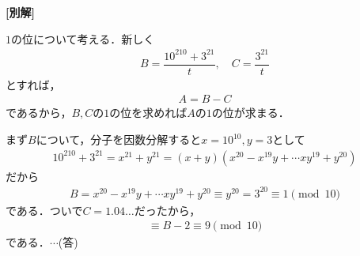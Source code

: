 \documentclass[../../main.tex]{subfiles}
\begin{document}
{\bf [別解]}

$1$の位について考える．新しく
\begin{align}
  B=\dfrac{10^{210}+3^{21}}{t}, \quad C=\dfrac{3^{21}}{t}
\end{align}
とすれば，
\begin{align}
  A = B - C
\end{align}
であるから，$B,C$の$1$の位を求めれば$A$の$1$の位が求まる．

まず$B$について，分子を因数分解すると$x=10^{10},y=3$として
\begin{align}
  10^{210}+3^{21} = x^{21}+y^{21} = (x+y)(x^{20}-x^{19}y+\cdots xy^{19}+y^{20})
\end{align}
だから
\begin{align}
  B = x^{20}-x^{19}y+\cdots xy^{19}+y^{20} \equiv y^{20} = 3^{20} \equiv 1 \pmod{10}
\end{align}
である．ついで$C=1.04\dots$だったから，
\begin{align}
  [A] \equiv B-2 \equiv 9 \pmod{10}
\end{align}
である．$\cdots$(答)

\newpage
\end{document}
